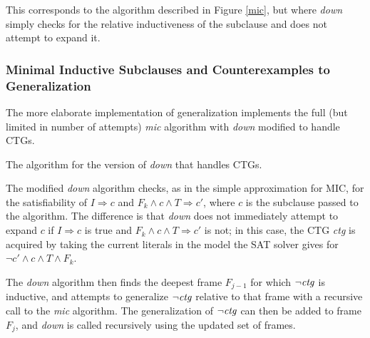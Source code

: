 \documentclass[12pt,a4paper,twoside,openright]{report}
\begin{document}
{This corresponds to the algorithm described in Figure \ref{mic}, but where {\it down} simply
checks for the relative inductiveness of the subclause and does not attempt to expand it.

\subsubsection{Minimal Inductive Subclauses and Counterexamples to Generalization}
The more elaborate implementation of generalization implements the full
(but limited in number of attempts) {\it mic} algorithm with {\it down} modified
to handle CTGs.

\begin{algorithm}[!Ht]
\DontPrintSemicolon
{}
\caption{The algorithm for the version of {\it down} that handles CTGs.}
\label{mic}
\end{algorithm}

The modified {\it down} algorithm checks, as in the simple approximation for MIC, for the satisfiability of
$I \Rightarrow c$ and $F_k \wedge c \wedge T \Rightarrow c'$, where $c$ is the subclause passed to
the algorithm.
The difference is that {\it down} does not immediately attempt to expand $c$
if $I \Rightarrow c$ is true and $F_k \wedge c \wedge T \Rightarrow c'$ is
not; in this case, the CTG {\it ctg} is acquired by taking the current literals in
the model the SAT solver gives for $\neg c' \wedge c \wedge T \wedge F_k$.

The {\it down} algorithm then finds the deepest frame $F_{j - 1}$ for which $\neg {\it ctg}$ is inductive,
and attempts to generalize $\neg {\it ctg}$ relative to that frame with a recursive call to the
{\it mic} algorithm. The generalization of $\neg {\it ctg}$ can then be added to frame $F_j$,
and {\it down} is called recursively using the updated set of frames.

}
\end{document}
